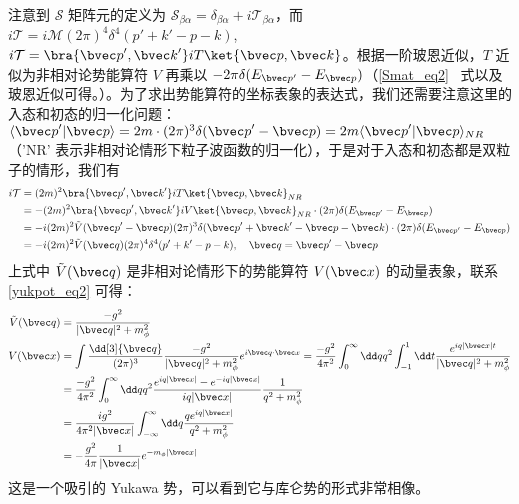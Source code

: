 注意到 $\mathcal{S}$ 矩阵元的定义为 $\mathcal{S}_{\beta\alpha}=\delta_{\beta\alpha}+i\mathcal{T}_{\beta\alpha}$，而 $i\mathcal{T}=i\mathcal{M}(2\pi)^4 \delta^4(p'+k'-p-k)$, $i\mathcal{T} = \bra{{\bvec p}',{\bvec k}'}iT\ket{{\bvec p},{\bvec k}}$。根据一阶玻恩近似，$T$ 近似为非相对论势能算符 $V$ 再乘以 $-2\pi\delta(E_{\bvec p'}-E_{\bvec p})$（\autoref{Smat_eq2}~ 式以及玻恩近似可得。）。为了求出势能算符的坐标表象的表达式，我们还需要注意这里的入态和初态的归一化问题：$\langle{\bvec p}'|{\bvec p}\rangle=2m\cdot (2\pi)^3 \delta({\bvec p}'-{\bvec p}) = 2m \langle{\bvec p}'|{\bvec p}\rangle_{NR}$（'NR' 表示非相对论情形下粒子波函数的归一化），于是对于入态和初态都是双粒子的情形，我们有
\begin{equation}
\begin{aligned} 
i\mathcal{T}&=(2m)^2\bra{{\bvec p}',{\bvec k}'}iT\ket{{\bvec p},{\bvec k}}_{NR}\\
& =-(2m)^2\bra{{\bvec p}',{\bvec k}'}iV\ket{{\bvec p},{\bvec k}}_{NR} \cdot (2\pi) \delta(E_{{\bvec p}'}-E_{\bvec p})
\\
& = -i(2m)^2 \tilde{V}({\bvec p}'-{\bvec p})(2\pi)^3 \delta({\bvec p}'+{\bvec k}'-{\bvec p}-{\bvec k})\cdot (2\pi) \delta(E_{{\bvec p}'}-E_{\bvec p})\\
&=-i(2m)^2 \tilde{V}(\bvec q) (2\pi)^4 \delta^4(p'+k'-p-k),\quad \bvec q={\bvec p}'-{\bvec p}
\end{aligned}
\end{equation}
上式中 $\tilde V(\bvec q)$ 是非相对论情形下的势能算符 $V(\bvec x)$ 的动量表象，联系\autoref{yukpot_eq2} 可得：
\begin{equation}
\begin{aligned}
\tilde{V}(\bvec q)&=\frac{-g^2}{|\bvec q|^2+m_\phi^2}\\
V({\bvec x})&=\int \frac{\dd[3]{\bvec q}}{(2\pi)^3} \frac{-g^2}{|\bvec q|^2+m_\phi^2}e^{i\bvec q\cdot {\bvec x}} =\frac{-g^2}{4\pi^2}\int_0^\infty \dd q q^2\int_{-1}^1 \dd t \frac{e^{iq|{\bvec x}|t}}{|\bvec q|^2+m_\phi^2}\\
&= \frac{-g^2}{4\pi^2}\int_0^\infty \dd q q^2\frac{e^{iq|{\bvec x}|}-e^{-iq|{\bvec x}|}}{iq|{\bvec x}|} \frac{1}{q^2+m_\phi^2}\\
&=\frac{ig^2}{4\pi^2|{\bvec x}|}\int_{-\infty}^\infty \dd q \frac{qe^{iq|{\bvec x}|}}{q^2+m_\phi^2}\\
&=-\frac{g^2}{4\pi}\frac{1}{|{\bvec x}|} e^{-m_\phi |{\bvec x}|}
\end{aligned}
\end{equation}
这是一个吸引的 Yukawa 势，可以看到它与库仑势的形式非常相像。
